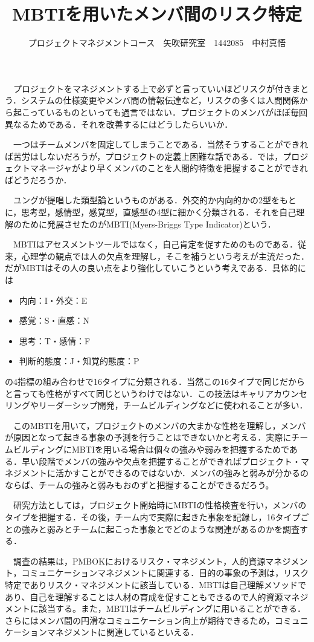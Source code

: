 \documentclass[uplatex,twocolumn,dvipdfmx]{jsarticle}
\title{\vspace{-5mm}\fontsize{14pt}{0pt}\selectfont MBTIを用いたメンバ間のリスク特定}
\author{\normalsize プロジェクトマネジメントコース　矢吹研究室　1442085　中村真悟}
\date{}
\begin{document}
\fontsize{10.5pt}{\baselineskip}\selectfont
\maketitle





　プロジェクトをマネジメントする上で必ずと言っていいほどリスクが付きまとう．システムの仕様変更やメンバ間の情報伝達など，リスクの多くは人間関係から起こっているものといっても過言ではない．プロジェクトのメンバがほぼ毎回異なるためである．それを改善するにはどうしたらいいか．

　一つはチームメンバを固定してしまうことである．当然そうすることができれば苦労はしないだろうが，プロジェクトの定義上困難な話である．では，プロジェクトマネージャがより早くメンバのことを人間的特徴を把握することができればどうだろうか．

　ユングが提唱した類型論というものがある．外交的か内向的かの2型をもとに，思考型，感情型，感覚型，直感型の4型に細かく分類される．それを自己理解のために発展させたのがMBTI(Myers-Briggs Type Indicator)という．

　MBTIはアセスメントツールではなく，自己肯定を促すためのものである．従来，心理学の観点では人の欠点を理解し，そこを補うという考えが主流だった．だがMBTIはその人の良い点をより強化していこうという考えである．具体的には
\begin{itemize}
 \item 内向：I・外交：E
 \item 感覚：S・直感：N
 \item 思考：T・感情：F
 \item 判断的態度：J・知覚的態度：P
\end{itemize}
の4指標の組み合わせで16タイプに分類される．当然この16タイプで同じだからと言っても性格がすべて同じというわけではない．この技法はキャリアカウンセリングやリーダーシップ開発，チームビルディングなどに使われることが多い．

　このMBTIを用いて，プロジェクトのメンバの大まかな性格を理解し，メンバが原因となって起きる事象の予測を行うことはできないかと考える．実際にチームビルディングにMBTIを用いる場合は個々の強みや弱みを把握するためである．早い段階でメンバの強みや欠点を把握することができればプロジェクト・マネジメントに活かすことができるのではないか．メンバの強みと弱みが分かるのならば、チームの強みと弱みもおのずと把握することができるだろう。

　研究方法としては，プロジェクト開始時にMBTIの性格検査を行い，メンバのタイプを把握する．その後，チーム内で実際に起きた事象を記録し，16タイプごとの強みと弱みとチームに起こった事象とでどのような関連があるのかを調査する．

　調査の結果は，PMBOKにおけるリスク・マネジメント，人的資源マネジメント，コミュニケーションマネジメントに関連する．目的の事象の予測は，リスク特定でありリスク・マネジメントに該当している．MBTIは自己理解メソッドであり、自己を理解することは人材の育成を促すこともできるので人的資源マネジメントに該当する。また，MBTIはチームビルディングに用いることができる．さらにはメンバ間の円滑なコミュニケーション向上が期待できるため，コミュニケーションマネジメントに関連しているといえる\nocite{BB19543658}\nocite{110003745117}\nocite{ylab2015}\nocite{katolab2015}．



\end{document}

